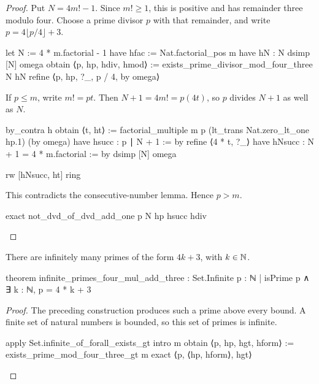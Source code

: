 \begin{proof}
  Put $N=4m!
    -1$.
  Since $m!
    \ge1$, this is positive and has remainder three modulo four.
  Choose a prime divisor $p$ with that remainder, and write $p=4\lfloor p/4\rfloor+3$.

  \begin{lean}
    let N := 4 * m.factorial - 1
    have hfac := Nat.factorial_pos m
    have hN : N %
      dsimp [N]
      omega
    obtain ⟨p, hp, hdiv, hmod⟩ := exists_prime_divisor_mod_four_three N hN
    refine ⟨p, hp, ?_, p / 4, by omega⟩
  \end{lean}

  If $p\le m$, write $m!
    =pt$.
  Then $N+1=4m!
    =p(4t)$, so $p$ divides $N+1$ as well as $N$.

  \begin{lean}
    by_contra h
    obtain ⟨t, ht⟩ := factorial_multiple m p (lt_trans Nat.zero_lt_one hp.1) (by omega)
    have hsucc : p ∣ N + 1 := by
      refine ⟨4 * t, ?_⟩
      have hNsucc : N + 1 = 4 * m.factorial := by
        dsimp [N]
        omega

      rw [hNsucc, ht]
      ring
  \end{lean}

  This contradicts the consecutive-number lemma.
  Hence $p>m$.

  \begin{lean}
    exact not_dvd_of_dvd_add_one p N hp hsucc hdiv
  \end{lean}

\end{proof}

\begin{theorem}
  \label{ent:thm:infinitely-many-primes-four-mul-add-three}
  There are infinitely many primes of the form $4k+3$, with $k\in\mathbb{N}$.

  \begin{lean}
    theorem infinite_primes_four_mul_add_three :
        Set.Infinite {p : ℕ | isPrime p ∧ ∃ k : ℕ, p = 4 * k + 3}
  \end{lean}
\end{theorem}

\begin{proof}
  The preceding construction produces such a prime above every bound.
  A finite set of natural numbers is bounded, so this set of primes is infinite.

  \begin{lean}
    apply Set.infinite_of_forall_exists_gt
    intro m
    obtain ⟨p, hp, hgt, hform⟩ := exists_prime_mod_four_three_gt m
    exact ⟨p, ⟨hp, hform⟩, hgt⟩
  \end{lean}

\end{proof}

